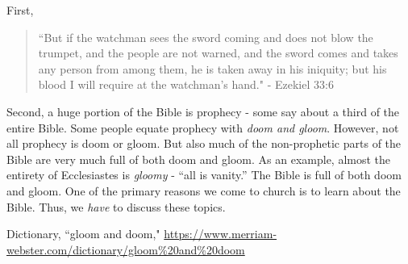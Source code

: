 \documentclass[10pt]{article}
\begin{document}
\begin{multicols}{2}
First,

\begin{quotation}
	``But if the watchman sees the sword coming and does not blow the trumpet, and the people are not warned, and the sword comes and takes any person from among them, he is taken away in his iniquity; but his blood I will require at the watchman’s hand." - Ezekiel 33:6
\end{quotation}






Second, a huge portion of the Bible is prophecy - some say about a third of the entire Bible. Some people equate prophecy with \textit{doom and gloom}. However, not all prophecy is doom or gloom. But also much of the non-prophetic parts of the Bible are very much full of both doom and gloom. As an example, almost the entirety of Ecclesiastes is \textit{gloomy} - ``all is vanity.'' The Bible is full of both doom and gloom.
One of the primary reasons we come to church is to learn about the Bible. Thus, we \textit{have} to discuss these topics.





\begin{thebibliography}{9}
	{\footnotesize
	 Dictionary, ``gloom and doom," \url{https://www.merriam-webster.com/dictionary/gloom%20and%20doom}

	}
\end{thebibliography}

\end{multicols}


\end{document}
